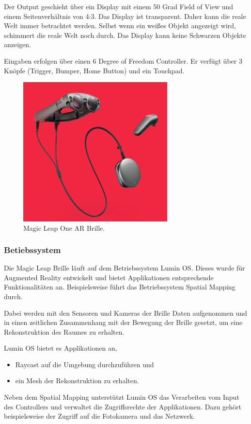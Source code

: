 Der Output geschieht über ein Display mit einem 50 Grad Field of View und einem Seitenverhältnis von 4:3. Das Display ist transparent. Daher kann die reale Welt immer betrachtet werden. Selbst wenn ein weißes Objekt angezeigt wird, schimmert die reale Welt noch durch. 
Das Display kann keine Schwarzen Objekte anzeigen. 

Eingaben erfolgen über einen 6 Degree of Freedom Controller. Er verfügt über 3 Knöpfe (Trigger, Bumper, Home Button) und ein Touchpad. \citep{mlofficialsalespitch,mlglossary}

\begin{figure}[H]
	\centering
	\includegraphics[width=0.7\textwidth]{images/img_magicLeap.PNG}
	\caption[]{Magic Leap One AR Brille.\citep{mlImage}}
	\label{viewManagement}
\end{figure}

\subsubsection{Betiebssystem}
Die Magic Leap Brille läuft auf dem Betriebssystem Lumin OS. Dieses wurde für Augmented Reality entwickelt und bietet Applikationen entsprechende Funktionalitäten an. Beispielsweise führt das Betriebssystem Spatial Mapping durch.\citep{mlluminOS,mlluminfeatures}

Dabei werden mit den Sensoren und Kameras der Brille Daten aufgenommen und in einen zeitlichen Zusammenhang mit der Bewegung der Brille gesetzt, um eine Rekonstruktion des Raumes zu erhalten.\citep{mlluminOS,mlluminfeatures,mlluminworldreconstruktion,mlmeshingunity}

Lumin OS bietet es Applikationen an,
\begin{itemize}
	\item Raycast auf die Umgebung durchzuführen und
	\item ein Mesh der Rekonstruktion zu erhalten.
\end{itemize}
Neben dem Spatial Mapping unterstützt Lumin OS das Verarbeiten vom Input des Controllers und verwaltet die Zugriffsrechte der Applikationen. Dazu gehört beispielsweise der Zugriff auf die Fotokamera und das Netzwerk.\citep{mlluminfeatures,mlappsecurity}



